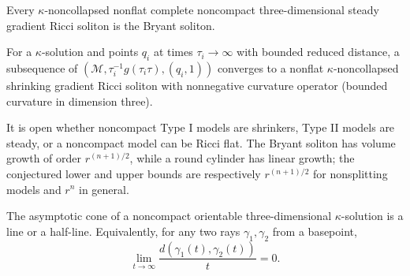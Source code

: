 \begin{theorem}
\label{thm:chow-iv-bryant-classification}
Every \(\kappa\)-noncollapsed nonflat complete noncompact three-dimensional
steady gradient Ricci soliton is the Bryant soliton.
\end{theorem}

\begin{theorem}
\label{thm:chow-iv-asymptotic-shrinker}
For a \(\kappa\)-solution and points \(q_i\) at times \(\tau_i\to\infty\)
with bounded reduced distance, a subsequence of
\((\mathcal M,\tau_i^{-1}g(\tau_i\tau),(q_i,1))\) converges to a nonflat
\(\kappa\)-noncollapsed shrinking gradient Ricci soliton with nonnegative
curvature operator (bounded curvature in dimension three).
\end{theorem}

\begin{remark}
\label{rem:chow-iv-volume-growth-problems}
It is open whether noncompact Type I models are shrinkers, Type II models are
steady, or a noncompact model can be Ricci flat.  The Bryant soliton has volume
growth of order \(r^{(n+1)/2}\), while a round cylinder has linear growth;
the conjectured lower and upper bounds are respectively \(r^{(n+1)/2}\) for
nonsplitting models and \(r^n\) in general.
\end{remark}

\begin{theorem}
\label{thm:chow-iv-3d-asymptotic-cone}
The asymptotic cone of a noncompact orientable three-dimensional
\(\kappa\)-solution is a line or a half-line.  Equivalently, for any two rays
\(\gamma_1,\gamma_2\) from a basepoint,
\[
\lim_{t\to\infty}\frac{d(\gamma_1(t),\gamma_2(t))}{t}=0.
\]
\end{theorem}


